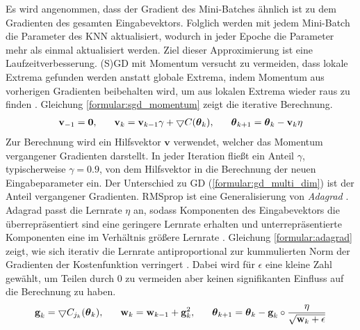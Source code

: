 Es wird angenommen, dass der Gradient des Mini-Batches ähnlich ist zu dem Gradienten des gesamten Eingabevektors.
Folglich werden mit jedem Mini-Batch die Parameter des KNN aktualisiert, wodurch in jeder Epoche die Parameter mehr als einmal aktualisiert werden.
Ziel dieser Approximierung ist eine Laufzeitverbesserung.
\newline
\newline
(S)GD mit Momentum versucht zu vermeiden, dass lokale Extrema gefunden werden anstatt globale Extrema, indem Momentum aus
vorherigen Gradienten beibehalten wird, um aus lokalen Extrema wieder raus zu finden \cite{higham2019deep}.
Gleichung \ref{formular:sgd_momentum} zeigt die iterative Berechnung.
\begin{align}
    \label{formular:sgd_momentum}
    \textbf{v}_{-1} = \textbf{0}, \hspace{0.6cm} \textbf{v}_k = \textbf{v}_{k-1}\gamma +
    \bigtriangledown C(\boldsymbol\theta_k), \hspace{0.6cm} \boldsymbol\theta_{k+1} = \boldsymbol\theta_k - \textbf{v}_k\eta
\end{align}
Zur Berechnung wird ein Hilfsvektor $\textbf{v}$ verwendet, welcher das Momentum vergangener Gradienten darstellt.
In jeder Iteration fließt ein Anteil $\gamma$, typischerweise $\gamma=0.9$, von dem Hilfsvektor in die Berechnung der neuen Eingabeparameter ein.
Der Unterschied zu GD (\ref{formular:gd_multi_dim}) ist der Anteil vergangener Gradienten.
\newline
\newline
RMSprop ist eine Generalisierung von \textit{Adagrad} \cite{mukkamala2017variants}.
Adagrad passt die Lernrate $\eta$ an, sodass Komponenten des Eingabevektors die überrepräsentiert sind eine geringere Lernrate erhalten und
unterrepräsentierte Komponenten eine im Verhältnis größere Lernrate \cite{duchi2011adaptive}.
Gleichung \ref{formular:adagrad} zeigt, wie sich iterativ die Lernrate antiproportional
zur kummulierten Norm der Gradienten der Kostenfunktion verringert \cite{lydia2019adagrad, kingma2014adam}.
Dabei wird für $\epsilon$ eine kleine Zahl gewählt, um Teilen durch 0 zu vermeiden aber keinen signifikanten Einfluss auf die Berechnung zu haben.
\begin{align}
    \label{formular:adagrad}
    \textbf{g}_k = \bigtriangledown C_{j_k}(\boldsymbol\theta_k), \hspace{0.6cm}
    \textbf{w}_k = \textbf{w}_{k-1} + \textbf{g}_k^2, \hspace{0.6cm}
    \boldsymbol\theta_{k+1} = \boldsymbol\theta_k - \textbf{g}_k \circ \frac{\eta}{\sqrt{\textbf{w}_k + \epsilon}}
\end{align}
